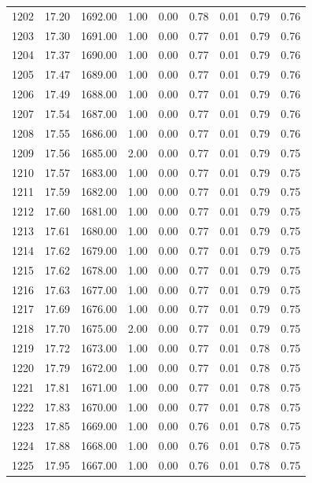 \documentclass{article}\usepackage[]{graphicx}\usepackage[]{color}
\begin{document}
\begin{longtable}{rrrrrrrrr}
  1202 & 17.20 & 1692.00 & 1.00 & 0.00 & 0.78 & 0.01 & 0.79 & 0.76 \\ 
  1203 & 17.30 & 1691.00 & 1.00 & 0.00 & 0.77 & 0.01 & 0.79 & 0.76 \\ 
  1204 & 17.37 & 1690.00 & 1.00 & 0.00 & 0.77 & 0.01 & 0.79 & 0.76 \\ 
  1205 & 17.47 & 1689.00 & 1.00 & 0.00 & 0.77 & 0.01 & 0.79 & 0.76 \\ 
  1206 & 17.49 & 1688.00 & 1.00 & 0.00 & 0.77 & 0.01 & 0.79 & 0.76 \\ 
  1207 & 17.54 & 1687.00 & 1.00 & 0.00 & 0.77 & 0.01 & 0.79 & 0.76 \\ 
  1208 & 17.55 & 1686.00 & 1.00 & 0.00 & 0.77 & 0.01 & 0.79 & 0.76 \\ 
  1209 & 17.56 & 1685.00 & 2.00 & 0.00 & 0.77 & 0.01 & 0.79 & 0.75 \\ 
  1210 & 17.57 & 1683.00 & 1.00 & 0.00 & 0.77 & 0.01 & 0.79 & 0.75 \\ 
  1211 & 17.59 & 1682.00 & 1.00 & 0.00 & 0.77 & 0.01 & 0.79 & 0.75 \\ 
  1212 & 17.60 & 1681.00 & 1.00 & 0.00 & 0.77 & 0.01 & 0.79 & 0.75 \\ 
  1213 & 17.61 & 1680.00 & 1.00 & 0.00 & 0.77 & 0.01 & 0.79 & 0.75 \\ 
  1214 & 17.62 & 1679.00 & 1.00 & 0.00 & 0.77 & 0.01 & 0.79 & 0.75 \\ 
  1215 & 17.62 & 1678.00 & 1.00 & 0.00 & 0.77 & 0.01 & 0.79 & 0.75 \\ 
  1216 & 17.63 & 1677.00 & 1.00 & 0.00 & 0.77 & 0.01 & 0.79 & 0.75 \\ 
  1217 & 17.69 & 1676.00 & 1.00 & 0.00 & 0.77 & 0.01 & 0.79 & 0.75 \\ 
  1218 & 17.70 & 1675.00 & 2.00 & 0.00 & 0.77 & 0.01 & 0.79 & 0.75 \\ 
  1219 & 17.72 & 1673.00 & 1.00 & 0.00 & 0.77 & 0.01 & 0.78 & 0.75 \\ 
  1220 & 17.79 & 1672.00 & 1.00 & 0.00 & 0.77 & 0.01 & 0.78 & 0.75 \\ 
  1221 & 17.81 & 1671.00 & 1.00 & 0.00 & 0.77 & 0.01 & 0.78 & 0.75 \\ 
  1222 & 17.83 & 1670.00 & 1.00 & 0.00 & 0.77 & 0.01 & 0.78 & 0.75 \\ 
  1223 & 17.85 & 1669.00 & 1.00 & 0.00 & 0.76 & 0.01 & 0.78 & 0.75 \\ 
  1224 & 17.88 & 1668.00 & 1.00 & 0.00 & 0.76 & 0.01 & 0.78 & 0.75 \\ 
  1225 & 17.95 & 1667.00 & 1.00 & 0.00 & 0.76 & 0.01 & 0.78 & 0.75 \\ 

\end{longtable}
\end{document}
